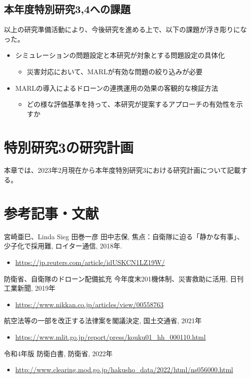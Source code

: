 \documentclass{article}[jsarticle]
\begin{document}
\subsection{本年度特別研究3,4への課題}
以上の研究準備活動により、今後研究を進める上で、以下の課題が浮き彫りになった。
\begin{itemize}
    \item シミュレーションの問題設定と本研究が対象とする問題設定の具体化
    \begin{itemize}
        \item 災害対応において、MARLが有効な問題の絞り込みが必要
    \end{itemize}
    \item MARLの導入によるドローンの連携運用の効果の客観的な検証方法
    \begin{itemize}
        \item どの様な評価基準を持って、本研究が提案するアプローチの有効性を示すか
    \end{itemize}
\end{itemize}

\section{特別研究3の研究計画}
本章では、2023年2月現在から本年度特別研究3における研究計画について記載する。

\appendix

\section{参考記事・文献}

\begin{thebibliography}{99}
     宮崎亜巳、Linda Sieg 田巻一彦 田中志保, 焦点：自衛隊に迫る「静かな有事」、少子化で採用難, ロイター通信, 2018年.
    \begin{itemize}
        \item \url{https://jp.reuters.com/article/idUSKCN1LZ19W/}
    \end{itemize}
     防衛省、自衛隊のドローン配備拡充 今年度末201機体制、災害救助に活用, 日刊工業新聞, 2019年
    \begin{itemize}
        \item \url{https://www.nikkan.co.jp/articles/view/00558763}
    \end{itemize}
     航空法等の一部を改正する法律案を閣議決定, 国土交通省, 2021年
    \begin{itemize}
        \item \url{https://www.mlit.go.jp/report/press/kouku01_hh_000110.html}
    \end{itemize}
     令和4年版 防衛白書, 防衛省, 2022年
    \begin{itemize}
        \item \url{http://www.clearing.mod.go.jp/hakusho_data/2022/html/ns056000.html}
    \end{itemize}
\end{thebibliography}
\end{document}
